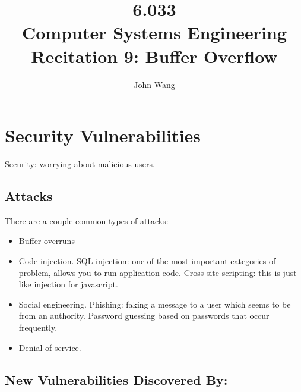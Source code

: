\documentclass[psamsfonts]{amsart}
\title{6.033 \\
Computer Systems Engineering \\
Recitation 9: Buffer Overflow}
\author{John Wang}
\begin{document}
\maketitle

\section{Security Vulnerabilities}

Security: worrying about malicious users.

\subsection{Attacks}

There are a couple common types of attacks:
\begin{itemize}
  \item Buffer overruns
  \item Code injection. SQL injection: one of the most important categories of problem, allows you to run application code. Cross-site scripting: this is just like injection for javascript.
  \item Social engineering. Phishing: faking a message to a user which seems to be from an authority. Password guessing based on passwords that occur frequently.
  \item Denial of service.
\end{itemize}

\subsection{New Vulnerabilities Discovered By:}
\end{document}
